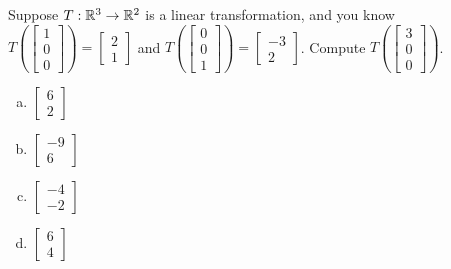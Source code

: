 \begin{applicationActivities}{1}{17}
\begin{activity}{5}
Suppose $T: \mathbb{R}^3 \rightarrow \mathbb{R}^2$ is a linear transformation, and you know $T\left(\begin{bmatrix} 1 \\ 0 \\ 0 \end{bmatrix} \right) = \begin{bmatrix} 2 \\ 1 \end{bmatrix} $ and $T\left(\begin{bmatrix} 0 \\ 0 \\ 1 \end{bmatrix} \right) = \begin{bmatrix} -3 \\ 2 \end{bmatrix} $.  Compute $T\left(\begin{bmatrix} 3 \\ 0 \\ 0 \end{bmatrix}\right)$.
\begin{multicols}{2}
\begin{enumerate}[(a)]
\item $\begin{bmatrix} 6 \\ 2\end{bmatrix}$
\item $\begin{bmatrix} -9 \\ 6 \end{bmatrix}$
\item $\begin{bmatrix} -4 \\ -2 \end{bmatrix}$
\item $\begin{bmatrix} 6 \\ 4 \end{bmatrix}$
\end{enumerate}
\end{multicols}
\end{activity}


\end{applicationActivities}
